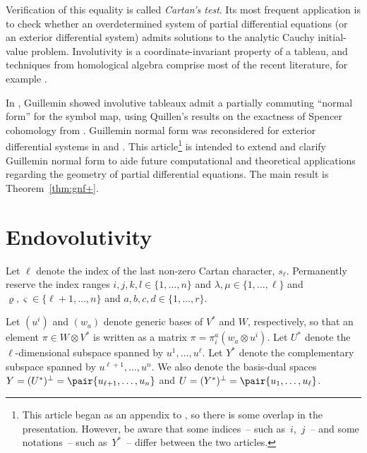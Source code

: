 Verif\/ication of this equality is called \textit{Cartan's test}. Its most
frequent application is to check whether an overdetermined system of partial
dif\/ferential equations (or an exterior dif\/ferential system) admits solutions to
the analytic Cauchy initial-value problem. Involutivity is a coor\-di\-na\-te-invariant property of a tableau,
and techniques from homological algebra comprise most of the
recent literature, for example \cite{CGG2009, Kruglikov2007, Malgrange2003}.

In \cite{Guillemin1968}, Guillemin showed involutive tableaux admit
a partially commuting ``normal form'' for the symbol map, using Quillen's results on the
exactness of Spencer cohomology from \cite{Quillen1964}.  Guillemin normal form
was reconsidered for exterior dif\/ferential systems in \cite{Yang1987} and
\cite{BCGGG}.  This
article\footnote{This article began as an appendix to \cite{Smith2014b}, so there is some overlap in the presentation.
However, be aware that some indices~-- such as~$i$,~$j$~-- and some notations~-- such
as~$Y^*$~-- dif\/fer between the two articles.}
is intended to extend and clarify Guillemin normal form
to aide future computational and theoretical applications regarding the
geometry of partial
dif\/ferential equations.  The main result is Theorem~\ref{thm:gnf+}.

\section{Endovolutivity}
\label{sec:notation}
Let $\ell$ denote the index of the last non-zero Cartan character, $s_\ell$.
Permanently reserve the index ranges
$i,j,k,l \in \{ 1, \ldots, n\}$ and
$\lambda,\mu \in \{ 1, \ldots, \ell\}$ and
$\varrho, \varsigma \in \{ \ell+1, \ldots, n\}$ and
$a,b,c,d \in \{1, \ldots, r\}$.

Let $(u^i)$ and $(w_a)$ denote generic bases of $V^*$ and $W$, respectively, so that an
element $\pi \in W \otimes V^*$ is written as a matrix $\pi = \pi^a_i
(w_a \otimes u^i)$.
Let $U^*$ denote the $\ell$-dimensional subspace spanned by $u^1, \ldots,
u^\ell$. Let $Y^*$ denote the complementary subspace spanned by $u^{\ell+1},
\ldots, u^n$.
We also denote the basis-dual spaces $Y=(U^*)^\perp=\pair{u_{\ell+1},\ldots,u_n}$ and $U = (Y^*)^\perp = \pair{u_1,
\ldots, u_\ell}$.

